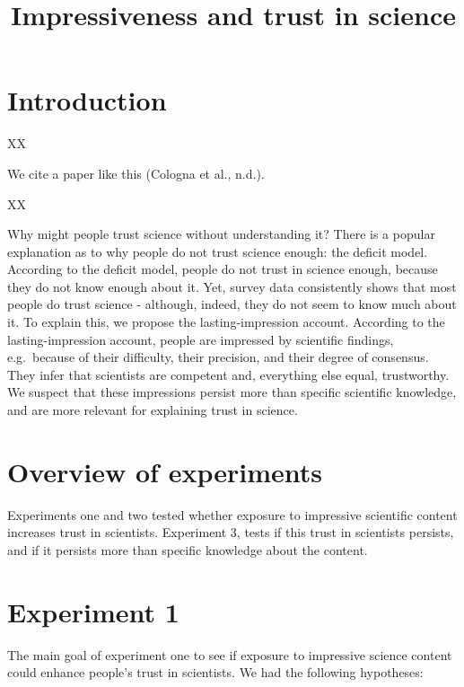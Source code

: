 \documentclass[
  doc,floatsintext]{apa6}
\title{Impressiveness and trust in science}
\author{\textsuperscript{}}
\date{}
\affiliation{\vspace{0.5cm}\textsuperscript{} }
\begin{document}
\maketitle

\hypertarget{introduction}{%
\section{Introduction}\label{introduction}}

XX

We cite a paper like this (Cologna et al., n.d.).

XX

Why might people trust science without understanding it? There is a popular explanation as to why people do not trust science enough: the deficit model. According to the deficit model, people do not trust in science enough, because they do not know enough about it. Yet, survey data consistently shows that most people do trust science - although, indeed, they do not seem to know much about it. To explain this, we propose the lasting-impression account. According to the lasting-impression account, people are impressed by scientific findings, e.g.~because of their difficulty, their precision, and their degree of consensus. They infer that scientists are competent and, everything else equal, trustworthy. We suspect that these impressions persist more than specific scientific knowledge, and are more relevant for explaining trust in science.

\hypertarget{overview-of-experiments}{%
\section{Overview of experiments}\label{overview-of-experiments}}

Experiments one and two tested whether exposure to impressive scientific content increases trust in scientists. Experiment 3, tests if this trust in scientists persists, and if it persists more than specific knowledge about the content.

\hypertarget{experiment-1}{%
\section{Experiment 1}\label{experiment-1}}

The main goal of experiment one to see if exposure to impressive science content could enhance people's trust in scientists. We had the following hypotheses:
\end{document}
